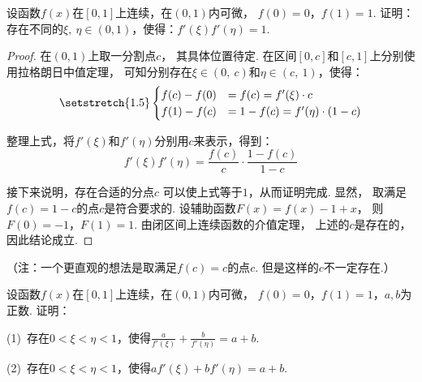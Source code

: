 \begin{example}
\label{ex:ch04-32}
设函数$f(x)$在$[0,1]$上连续，在$(0,1)$内可微，
$f(0)=0$，$f(1)=1$.
证明：存在不同的$\xi,~\eta \in (0,1)$，使得：$f'(\xi)f'(\eta) = 1$.
\end{example}

\begin{proof}
在$(0,1)$上取一分割点$c$，
其具体位置待定.
在区间$[0,c]$和$[c,1]$上分别使用拉格朗日中值定理，
可知分别存在$\xi \in (0,~c)$和$\eta \in (c,~1)$，使得：
\[ \setstretch{1.5}
\begin{cases}
    f(c) - f(0) &= f(c) = f'(\xi) \cdot c \\
    f(1) - f(c) &= 1- f(c) = f'(\eta) \cdot (1-c)
\end{cases}
\]  \par
整理上式，将$f'(\xi)$和$f'(\eta)$分别用$c$来表示，得到：
$$
f'(\xi) f'(\eta) = \frac{f(c)}{c} \cdot \frac{1-f(c)}{1-c}
$$

接下来说明，存在合适的分点$c$
可以使上式等于$1$，从而证明完成.
显然，
取满足$f(c) = 1-c$的点$c$是符合要求的.
设辅助函数$F(x) = f(x) - 1 + x$，
则$F(0) = -1$，$F(1) = 1$.
由闭区间上连续函数的介值定理，
上述的$c$是存在的，因此结论成立.
\end{proof}

（注：一个更直观的想法是取满足$f(c) = c$的点$c$.
但是这样的$c$不一定存在.）

\begin{example}
\label{ex:ch04-33}
设函数$f(x)$在$[0,1]$上连续，在$(0,1)$内可微，
$f(0)=0$，$f(1)=1$，$a,b$为正数. 证明：\par

(1)~存在$0<\xi<\eta<1$，使得$\frac{a}{f'(\xi)} + \frac{b}{f'(\eta)} = a + b$.

(2)~存在$0<\xi<\eta<1$，使得$af'(\xi)+bf'(\eta) = a+b$.
\end{example}

